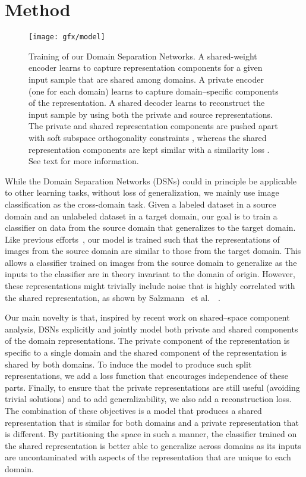 \documentclass{article}
\newcommand{\etal}{~et al.~}
\begin{document}
\section{Method}
\vspace{-4mm}
\label{sec:model}
\begin{figure}[tb]
     \centering
     \texttt{[image: gfx/model]}
     \caption{Training of our Domain Separation Networks. A shared-weight encoder  learns to capture representation components for a given input sample that are shared among domains. A private encoder  (one for each domain) learns to capture domain--specific components of the representation. A shared decoder learns to reconstruct the input sample by using both the private and source representations. The private and shared representation components are pushed apart with soft subspace orthogonality constraints , whereas the shared representation components are kept similar with a similarity loss . See text for more information.}
     \label{fig:model}
\end{figure}
While the Domain Separation Networks (DSNs) could in principle be applicable to other learning tasks, without loss of generalization, we mainly use
image classification as the cross-domain task. Given a labeled dataset in a source domain and
an unlabeled dataset in a target domain, our goal is to train a classifier on data
from the source domain that generalizes to the target domain. Like previous efforts~\cite{ganin2014unsupervised,ganin2016domain},
our model is trained such that the representations of images from the source
domain are similar to those from the target domain. This allows
a classifier trained on images from the source domain to generalize
as the inputs to the classifier are in theory invariant to the domain of origin. However, these representations might trivially include noise that is highly correlated with the shared
representation, as shown by Salzmann \etal ~\cite{salzmann2010factorized}.

Our main novelty is that, inspired by recent
work \cite{jia2010factorized,salzmann2010factorized,virtanen2011bayesian} on 
shared--space component analysis, DSNs explicitly and jointly model both private and shared components of the domain representations. The private component
of the representation is specific to a single domain and the shared component
of the representation is shared by both domains. To induce the model to 
produce such split representations, we add a loss function that encourages
independence of these parts. Finally, to ensure that the private
representations are still useful (avoiding trivial solutions) and to add
generalizability, we also add a reconstruction loss.
The combination of these objectives is a model that produces a shared
representation that is similar for both domains and a private representation that
is different. By partitioning the space in such a manner, the classifier trained on
the shared representation is better able to generalize across domains as its inputs
are uncontaminated with aspects of the representation that are unique to each domain.
\end{document}

